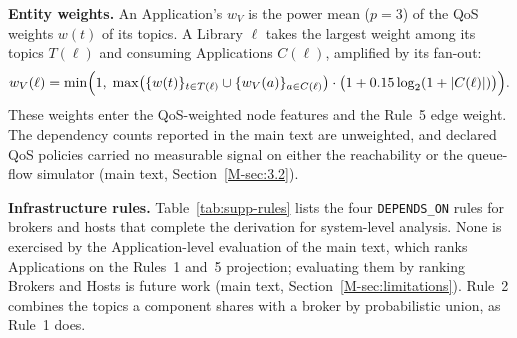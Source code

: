 \documentclass[preprint,3p]{elsarticle}
\begin{document}
\noindent\textbf{Entity weights.} An Application's $w_V$ is the power mean ($p = 3$) of the QoS weights $w(t)$ of its topics. A Library $\ell$ takes the largest weight among its topics $T(\ell)$ and consuming Applications $C(\ell)$, amplified by its fan-out:
\begin{equation*}
w_V(\ell) = \min\Bigl(1,\; \max\bigl(\{w(t)\}_{t \in T(\ell)} \cup \{w_V(a)\}_{a \in C(\ell)}\bigr) \cdot \bigl(1 + 0.15 \log_2(1 + |C(\ell)|)\bigr)\Bigr).
\end{equation*}
These weights enter the QoS-weighted node features and the Rule~5 edge weight. The dependency counts reported in the main text are unweighted, and declared QoS policies carried no measurable signal on either the reachability or the queue-flow simulator (main text, Section~\ref{M-sec:3.2}).

\noindent\textbf{Infrastructure rules.} Table~\ref{tab:supp-rules} lists the four \texttt{DEPENDS\_ON} rules for brokers and hosts that complete the derivation for system-level analysis. None is exercised by the Application-level evaluation of the main text, which ranks Applications on the Rules~1 and~5 projection; evaluating them by ranking Brokers and Hosts is future work (main text, Section~\ref{M-sec:limitations}). Rule~2 combines the topics a component shares with a broker by probabilistic union, as Rule~1 does.

\begin{table}[htbp]
\centering
\small
\caption{Infrastructure \texttt{DEPENDS\_ON} rules (not evaluated).}
\label{tab:supp-rules}
\end{table}
\end{document}
